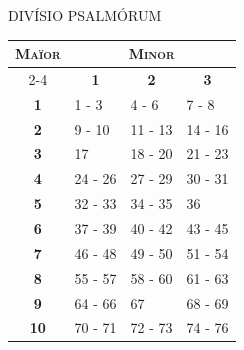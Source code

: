 
\begin{center}
{\formatTextPsalmChapter DIVÍSIO PSALMÓRUM}
\end{center}

\begin{center}
\end{center}

{
  \begin{table}[h]
  \centering
  \footnotesize
  \begin{tabular}{|cccc|}
  \hline
  \multicolumn{1}{|c|}{\multirow{2}{*}{\textbf{\textsc{Maïor}}}} & \multicolumn{3}{c|}{\textbf{\textsc{Minor}}}   \\ \cline{2-4}
  \multicolumn{1}{|c|}{}   & \multicolumn{1}{c|}{\textbf{1}} & \multicolumn{1}{c|}{\textbf{2}} & \multicolumn{1}{c|}{\textbf{3}} \\ \hline
  \multicolumn{1}{|c|}{\textbf{1}}  & \multicolumn{1}{l|}{1 - 3} & \multicolumn{1}{l|}{4 - 6} & \multicolumn{1}{l|}{7 - 8} \\ \hline
  \multicolumn{1}{|c|}{\textbf{2}}  & \multicolumn{1}{l|}{9 - 10} & \multicolumn{1}{l|}{11 - 13} & \multicolumn{1}{l|}{14 - 16} \\ \hline
  \multicolumn{1}{|c|}{\textbf{3}}  & \multicolumn{1}{l|}{17} & \multicolumn{1}{l|}{18 - 20} & \multicolumn{1}{l|}{21 - 23} \\ \hline
  \multicolumn{1}{|c|}{\textbf{4}}  & \multicolumn{1}{l|}{24 - 26} & \multicolumn{1}{l|}{27 - 29} & \multicolumn{1}{l|}{30 - 31} \\ \hline
  \multicolumn{1}{|c|}{\textbf{5}}  & \multicolumn{1}{l|}{32 - 33} & \multicolumn{1}{l|}{34 - 35} & \multicolumn{1}{l|}{36} \\ \hline
  \multicolumn{1}{|c|}{\textbf{6}}  & \multicolumn{1}{l|}{37 - 39} & \multicolumn{1}{l|}{40 - 42} & \multicolumn{1}{l|}{43 - 45} \\ \hline
  \multicolumn{1}{|c|}{\textbf{7}}  & \multicolumn{1}{l|}{46 - 48} & \multicolumn{1}{l|}{49 - 50} & \multicolumn{1}{l|}{51 - 54} \\ \hline
  \multicolumn{1}{|c|}{\textbf{8}}  & \multicolumn{1}{l|}{55 - 57} & \multicolumn{1}{l|}{58 - 60} & \multicolumn{1}{l|}{61 - 63} \\ \hline
  \multicolumn{1}{|c|}{\textbf{9}}  & \multicolumn{1}{l|}{64 - 66} & \multicolumn{1}{l|}{67} & \multicolumn{1}{l|}{68 - 69} \\ \hline
  \multicolumn{1}{|c|}{\textbf{10}} & \multicolumn{1}{l|}{70 - 71} & \multicolumn{1}{l|}{72 - 73} & \multicolumn{1}{l|}{74 - 76} \\ \hline

\end{tabular}
\end{table}}
